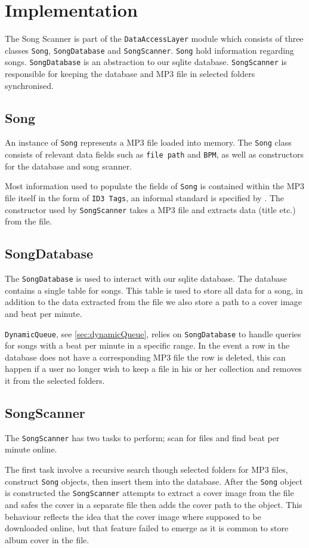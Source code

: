 \section{Implementation}
The Song Scanner is part of the \texttt{DataAccessLayer} module which consists of three classes \texttt{Song}, \texttt{SongDatabase} and \texttt{SongScanner}. \texttt{Song} hold information regarding songs. \texttt{SongDatabase} is an abstraction to our sqlite database. \texttt{SongScanner} is responsible for keeping the database and MP3 file in selected folders synchronised.

\subsection{Song}
An instance of \texttt{Song} represents a MP3 file loaded into memory. The \texttt{Song} class consists of relevant data fields such as \texttt{file path} and \texttt{BPM}, as well as constructors for the database and song scanner. 

Most information used to populate the fields of \texttt{Song} is contained within the MP3 file itself in the form of \texttt{ID3 Tags}, an informal standard is specified by \citet{ID3:standard}. The constructor used by \texttt{SongScanner} takes a MP3 file and extracts data (title etc.) from the file.

\subsection{SongDatabase}
The \texttt{SongDatabase} is used to interact with our sqlite database. The database contains a single table for songs. This table is used to store all data for a song, in addition to the data extracted from the file we also store a path to a cover image and beat per minute.

\texttt{DynamicQueue}, see \cref{sec:dynamicQueue}, relies on \texttt{SongDatabase} to handle queries for songs with a beat per minute in a specific range. In the event a row in the database does not have a corresponding MP3 file the row is deleted, this can happen if a user no longer wish to keep a file in his or her collection and removes it from the selected folders. 

\subsection{SongScanner} 
The \texttt{SongScanner} has two tasks to perform; scan for files and find beat per minute online.

The first task involve a recursive search though selected folders for MP3 files, construct \texttt{Song} objects, then insert them into the database. After the \texttt{Song} object is constructed the \texttt{SongScanner} attempts to extract a cover image from the file and safes the cover in a separate file then adds the cover path to the object. This behaviour reflects the idea that the cover image where supposed to be downloaded online, but that feature failed to emerge as it is common to store album cover in the file. 



